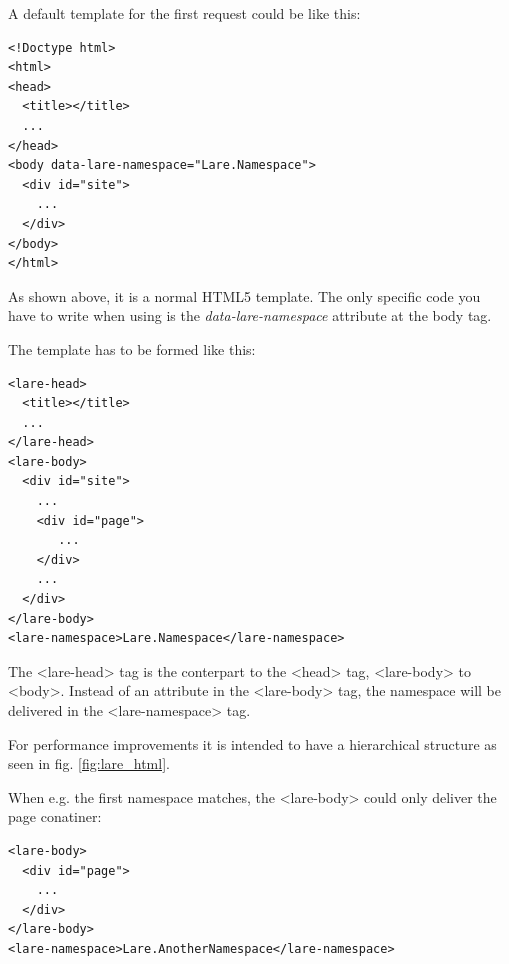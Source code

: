 A default template for the first request could be like this:

\begin{minipage}[c]{0.95\linewidth}
\begin{lstlisting}
<!Doctype html>
<html>
<head>
  <title></title>
  ...
</head>
<body data-lare-namespace="Lare.Namespace">
  <div id="site">
    ...
  </div>
</body>
</html>
\end{lstlisting}
\end{minipage}

As shown above, it is a normal HTML5 template.
The only specific code you have to write when using \lare{} is the \emph{data-lare-namespace} attribute at the body tag.

The \lare{} template has to be formed like this:

\begin{minipage}[c]{0.95\linewidth}
\begin{lstlisting}
<lare-head>
  <title></title>
  ...
</lare-head>
<lare-body>
  <div id="site">
    ...
    <div id="page">
       ...
    </div>
    ...
  </div>
</lare-body>
<lare-namespace>Lare.Namespace</lare-namespace>
\end{lstlisting}
\end{minipage}

The <lare-head> tag is the conterpart to the <head> tag, <lare-body> to <body>.
Instead of an attribute in the <lare-body> tag, the namespace will be delivered in the <lare-namespace> tag.

For performance improvements it is intended to have a hierarchical structure as seen in fig. \ref{fig:lare_html}.

When e.g. the first namespace matches, the <lare-body> could only deliver the page conatiner:

\begin{minipage}[c]{0.95\linewidth}
\begin{lstlisting}
<lare-body>
  <div id="page">
    ...
  </div>
</lare-body>
<lare-namespace>Lare.AnotherNamespace</lare-namespace>
\end{lstlisting}
\end{minipage}



